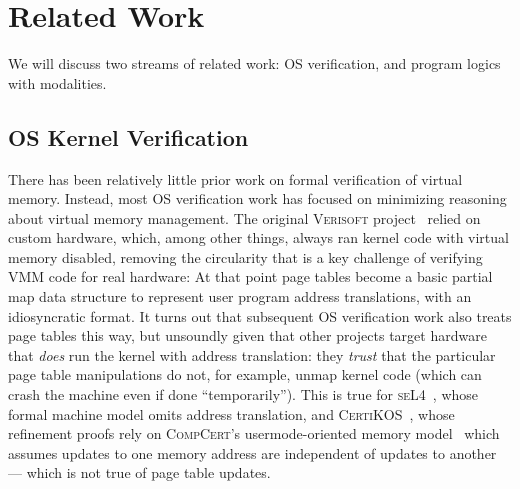 \section{Related Work}
\label{sec:relwork}

We will discuss two streams of related work: OS verification, and 
program logics with modalities.

\subsection{OS Kernel Verification}
There has been relatively little prior work on formal verification of virtual memory.
Instead, most OS verification work has focused on minimizing reasoning about virtual memory management.
The original \textsc{Verisoft} project~\cite{alkassar2008verisoft,alkassar2010pervasive,alkassar2008formal,dalinger2005verification,hillebrand2005address,alkassar2008formal,starostin2010formal} 
relied on custom hardware, which, among other things, always ran kernel code with virtual memory disabled, removing the circularity that is a key challenge of verifying
VMM code for real hardware: At that point page tables become a basic partial map data structure to represent user program address translations,
with an idiosyncratic format. It turns out that subsequent OS verification work also treats page tables this way, but
unsoundly given that other projects target hardware that \emph{does} run the kernel with address translation: they \emph{trust}
that the particular page table manipulations do not, for example, unmap kernel code (which can crash the machine even if done ``temporarily'').
This is true for \textsc{seL4}~\cite{Klein2009seL4,seL4TOCS,Sewell2013translation}, whose formal machine model omits address translation,
and \textsc{CertiKOS}~\cite{gu15,gu2016certikos,gu2018certikos,chen2016interrupts}, whose refinement proofs rely on
\textsc{CompCert}'s usermode-oriented memory model~\cite{leroy2008formal,leroy2009formally} which assumes
updates to one memory address are independent of updates to another ---
which is not true of page table updates.
